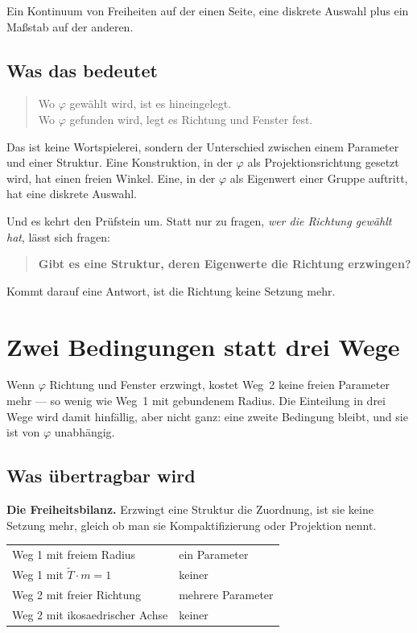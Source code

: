 Ein Kontinuum von Freiheiten auf der einen Seite, eine diskrete Auswahl
plus ein Maßstab auf der anderen.

\section{Was das bedeutet}

\begin{quote}
Wo $\varphi$ gewählt wird, ist es hineingelegt.\\
Wo $\varphi$ gefunden wird, legt es Richtung und Fenster fest.
\end{quote}

Das ist keine Wortspielerei, sondern der Unterschied zwischen einem
Parameter und einer Struktur. Eine Konstruktion, in der $\varphi$ als
Projektionsrichtung gesetzt wird, hat einen freien Winkel. Eine, in der
$\varphi$ als Eigenwert einer Gruppe auftritt, hat eine diskrete
Auswahl.

Und es kehrt den Prüfstein um. Statt nur zu fragen, \emph{wer die
Richtung gewählt hat}, lässt sich fragen:

\begin{quote}
\textbf{Gibt es eine Struktur, deren Eigenwerte die Richtung
erzwingen?}
\end{quote}

Kommt darauf eine Antwort, ist die Richtung keine Setzung mehr.

\chapter{Zwei Bedingungen statt drei Wege}

Wenn $\varphi$ Richtung und Fenster erzwingt, kostet Weg~2 keine freien
Parameter mehr --- so wenig wie Weg~1 mit gebundenem Radius. Die
Einteilung in drei Wege wird damit hinfällig, aber nicht ganz: eine
zweite Bedingung bleibt, und sie ist von $\varphi$ unabhängig.

\section{Was übertragbar wird}

\textbf{Die Freiheitsbilanz.} Erzwingt eine Struktur die Zuordnung, ist
sie keine Setzung mehr, gleich ob man sie Kompaktifizierung oder
Projektion nennt.
\begin{center}
\begin{tabular}{ll}
Weg 1 mit freiem Radius & ein Parameter \\
Weg 1 mit $\tilde T \cdot m = 1$ & keiner \\
Weg 2 mit freier Richtung & mehrere Parameter \\
Weg 2 mit ikosaedrischer Achse & keiner \\
\end{tabular}
\end{center}

